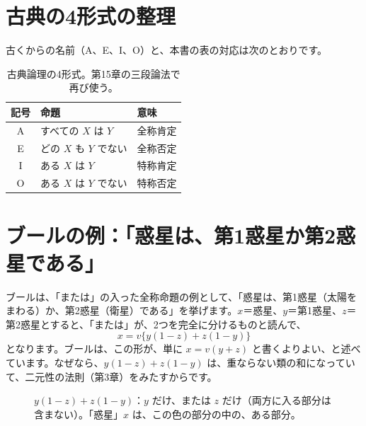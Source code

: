 \documentclass[a4paper,11pt,openany]{ltjsbook}
\begin{document}
\section{古典の4形式の整理}

古くからの名前（A、E、I、O）と、本書の表の対応は次のとおりです。

\begin{table}[htbp]
\centering
\begin{tabular}{cll}
\toprule
記号 & 命題 & 意味\\
\midrule
A & すべての $X$ は $Y$ & 全称肯定\\
E & どの $X$ も $Y$ でない & 全称否定\\
I & ある $X$ は $Y$ & 特称肯定\\
O & ある $X$ は $Y$ でない & 特称否定\\
\bottomrule
\end{tabular}
\caption{古典論理の4形式。第15章の三段論法で再び使う。}
\end{table}

\section{ブールの例：「惑星は、第1惑星か第2惑星である」}

ブールは、「または」の入った全称命題の例として、「惑星は、第1惑星（太陽をまわる）か、第2惑星（衛星）である」を挙げます。$x$＝惑星、$y$＝第1惑星、$z$＝第2惑星とすると、「または」が、2つを完全に分けるものと読んで、
\[
x=v\bigl\{y(1-z)+z(1-y)\bigr\}
\]
となります。ブールは、この形が、単に $x=v(y+z)$ と書くよりよい、と述べています。なぜなら、$y(1-z)+z(1-y)$ は、重ならない類の和になっていて、二元性の法則（第3章）をみたすからです。

\begin{figure}[htbp]
\centering
{}
\caption{$y(1-z)+z(1-y)$：$y$ だけ、または $z$ だけ（両方に入る部分は含まない）。「惑星」$x$ は、この色の部分の中の、ある部分。}
\end{figure}
\end{document}
